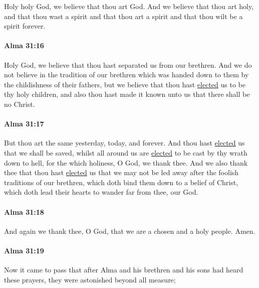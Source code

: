 			Holy holy God, we believe that thou art God.
			And we believe that thou art holy,
			and that thou wast a spirit
			and that thou art a spirit
			and that thou wilt be a spirit forever.

		\paragraph{Alma 31:16} %
			\label{ALMA-31-16}

			Holy God, we believe that thou hast separated us from our brethren.
			And we do not believe in the tradition of our brethren
			which was handed down to them by the childishness of their fathers,
			but we believe that thou hast \hyperref[ELECTION]{elected} us to be thy holy children,
			and also thou hast made it known unto us that there shall be no Christ.

		\paragraph{Alma 31:17} %
			\label{ALMA-31-17}

			But thou art the same yesterday, today, and forever.
			And thou hast \hyperref[ELECTION]{elected} us that we shall be saved,
			whilst all around us are \hyperref[ELECTION]{elected} to be cast by thy wrath down to hell,
			for the which holiness, O God, we thank thee.
			And we also thank thee that thou hast \hyperref[ELECTION]{elected} us
			that we may not be led away after the foolish traditions of our brethren,
			which doth bind them down to a belief of Christ,
			which doth lead their hearts to wander far from thee, our God.

		\paragraph{Alma 31:18} %
			\label{ALMA-31-18}

			And again we thank thee, O God,
			that we are a chosen and a holy people.
			Amen.

		\paragraph{Alma 31:19} %
			\label{ALMA-31-19}

			Now it came to pass that
			after Alma and his brethren and his sons had heard these prayers,
			they were astonished beyond all measure;

